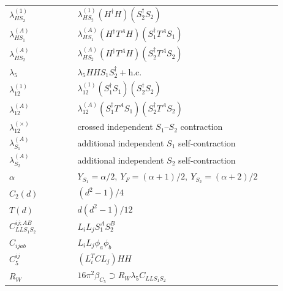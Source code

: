 \documentclass[9pt]{article}
\begin{document}
\begin{longtable}{@{}p{0.23\linewidth}p{0.69\linewidth}@{}}
$\lambda_{HS_2}^{(1)}$ & $\lambda_{HS_2}^{(1)}(H^\dagger H)(S_2^\dagger S_2)$ \\
$\lambda_{HS_1}^{(A)}$ & $\lambda_{HS_1}^{(A)}(H^\dagger T^AH)(S_1^\dagger T^AS_1)$ \\
$\lambda_{HS_2}^{(A)}$ & $\lambda_{HS_2}^{(A)}(H^\dagger T^AH)(S_2^\dagger T^AS_2)$ \\
$\lambda_5$ & $\lambda_5HHS_1S_2^\dagger+\mathrm{h.c.}$ \\
$\lambda_{12}^{(1)}$ & $\lambda_{12}^{(1)}(S_1^\dagger S_1)(S_2^\dagger S_2)$ \\
$\lambda_{12}^{(A)}$ & $\lambda_{12}^{(A)}(S_1^\dagger T^AS_1)(S_2^\dagger T^AS_2)$ \\
$\lambda_{12}^{(\times)}$ & crossed independent $S_1$--$S_2$ contraction \\
$\lambda_{S_1}^{(A)}$ & additional independent $S_1$ self-contraction \\
$\lambda_{S_2}^{(A)}$ & additional independent $S_2$ self-contraction \\
$\alpha$ & $Y_{S_1}=\alpha/2,\ Y_F=(\alpha+1)/2,\ Y_{S_2}=(\alpha+2)/2$ \\
$C_2(d)$ & $(d^2-1)/4$ \\
$T(d)$ & $d(d^2-1)/12$ \\
$C_{LLS_1S_2}^{ij;AB}$ & $L_iL_jS_1^AS_2^B$ \\
$C_{ijab}$ & $L_iL_j\phi_a\phi_b$ \\
$C_5^{ij}$ & $(L_i^TCL_j)HH$ \\
$R_W$ & $16\pi^2\beta_{C_5}\supset R_W\lambda_5C_{LLS_1S_2}$ \\
\bottomrule
\end{longtable}
\end{document}
